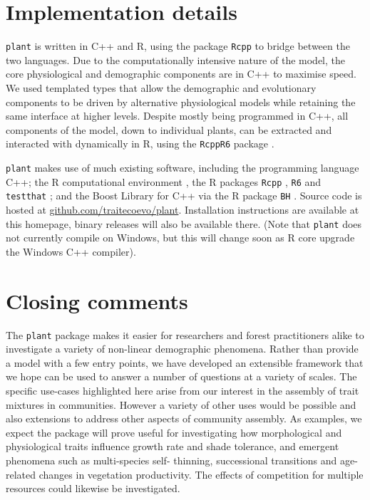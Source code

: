 \documentclass[a4paper,11pt]{article}
\newcommand{\plant}{\texttt{plant}}
\begin{document}
\section{Implementation details}

{\plant} is written in C++ and R, using the package \texttt{Rcpp}
\citep{Eddelbuettel-2011, Eddelbuettel-2013} to bridge between the two
languages. Due to the computationally intensive nature of the model, the
core physiological and demographic components are in C++ to maximise
speed. We used templated types that allow the demographic and evolutionary
components to be driven by alternative physiological models while
retaining the same interface at higher levels. Despite mostly being
programmed in C++, all components of the model, down to individual
plants, can be extracted and interacted with dynamically in R, using the
\texttt{RcppR6} package \citep{RcppR6}.

{\plant} makes use of much existing software, including the programming
language C++; the R computational environment \citep{R-2015}, the R
packages \texttt{Rcpp} \citep{Eddelbuettel-2011, Eddelbuettel-2013},
\texttt{R6} \citep{Chang-2014} and \texttt{testthat}
\citep{Wickham-2011}; and the Boost Library for C++
\citep{Schaling-2014} via the R package \texttt{BH}
\citep{Eddelbuettel-2015}. Source code is hosted at
\href{https://github.com/traitecoevo/plant}{github.com/traitecoevo/plant}.
Installation instructions are available at this homepage, binary
releases will also be available there.  (Note that {\plant} does not
currently compile on Windows, but this will change soon as R core
upgrade the Windows C++ compiler).

\section{Closing comments}

The {\plant} package makes it easier for researchers and forest practitioners
alike to investigate a variety of non-linear demographic phenomena.  Rather
than provide a model with a few entry points, we have developed an extensible
framework that we hope can be used to answer a number of questions at a
variety of scales. The specific use-cases highlighted here arise from our
interest in the assembly of trait mixtures in communities. However a variety
of other uses would be possible and also extensions to address other aspects
of community assembly. As examples, we expect the package will prove useful
for investigating how morphological and physiological traits influence growth
rate and shade tolerance, and emergent phenomena such as multi-species self-
thinning, successional transitions and age-related changes in vegetation
productivity. The effects of competition
for multiple resources could likewise be investigated.
\end{document}
